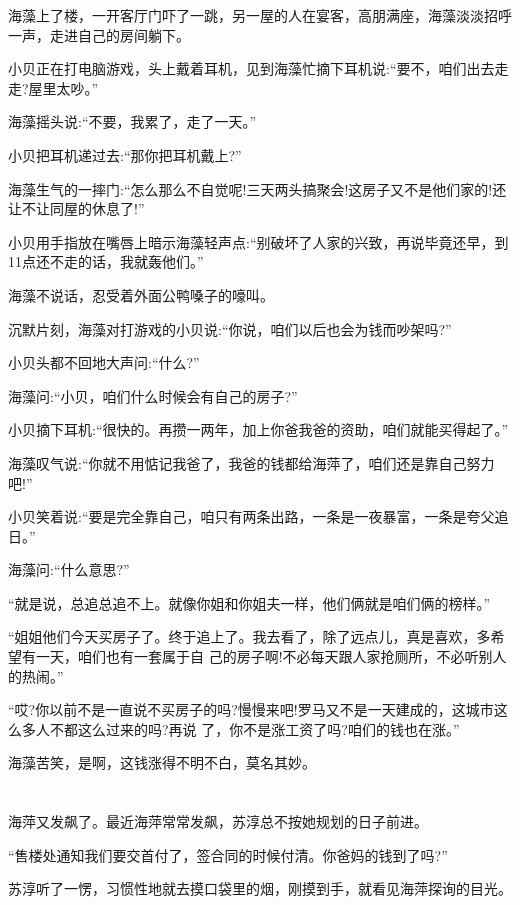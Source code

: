 \documentclass[11pt,a4paper,onecolumn]{article}
\begin{document}
海藻上了楼，一开客厅门吓了一跳，另一屋的人在宴客，高朋满座，海藻淡淡招呼一声，走进自己的房间躺下。

小贝正在打电脑游戏，头上戴着耳机，见到海藻忙摘下耳机说:``要不，咱们出去走走?屋里太吵。''

海藻摇头说:``不要，我累了，走了一天。''

小贝把耳机递过去:``那你把耳机戴上?''

海藻生气的一摔门:``怎么那么不自觉呢!三天两头搞聚会!这房子又不是他们家的!还让不让同屋的休息了!''

小贝用手指放在嘴唇上暗示海藻轻声点:``别破坏了人家的兴致，再说毕竟还早，到11点还不走的话，我就轰他们。''

海藻不说话，忍受着外面公鸭嗓子的嚎叫。

沉默片刻，海藻对打游戏的小贝说:``你说，咱们以后也会为钱而吵架吗?''

小贝头都不回地大声问:``什么?''

海藻问:``小贝，咱们什么时候会有自己的房子?''

小贝摘下耳机:``很快的。再攒一两年，加上你爸我爸的资助，咱们就能买得起了。''

海藻叹气说:``你就不用惦记我爸了，我爸的钱都给海萍了，咱们还是靠自己努力吧!''

小贝笑着说:``要是完全靠自己，咱只有两条出路，一条是一夜暴富，一条是夸父追日。''

海藻问:``什么意思?''

``就是说，总追总追不上。就像你姐和你姐夫一样，他们俩就是咱们俩的榜样。''

``姐姐他们今天买房子了。终于追上了。我去看了，除了远点儿，真是喜欢，多希望有一天，咱们也有一套属于自
己的房子啊!不必每天跟人家抢厕所，不必听别人的热闹。''

``哎?你以前不是一直说不买房子的吗?慢慢来吧!罗马又不是一天建成的，这城市这么多人不都这么过来的吗?再说
了，你不是涨工资了吗?咱们的钱也在涨。''

海藻苦笑，是啊，这钱涨得不明不白，莫名其妙。

\section[\thesection]{}

海萍又发飙了。最近海萍常常发飙，苏淳总不按她规划的日子前进。

``售楼处通知我们要交首付了，签合同的时候付清。你爸妈的钱到了吗?''

苏淳听了一愣，习惯性地就去摸口袋里的烟，刚摸到手，就看见海萍探询的目光。
\end{document}
